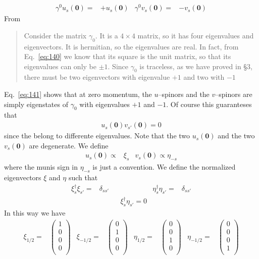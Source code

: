 \begin{frame}
\begin{align}
\label{eq:141}
\gamma^0u_s(\mathbf{0})=&+u_s(\mathbf{0})&    \gamma^0v_s(\mathbf{0})=&-v_s(\mathbf{0})
\end{align}
From \cite{physics/0703214}
\begin{quote}
  Consider the matrix $\gamma_0$. It is a $4\times4$ matrix, so it has four eigenvalues and eigenvectors. It is hermitian, so the eigenvalues are real. In fact, from Eq.~\eqref{eq:140} we know that its square is the unit matrix, so that its eigenvalues can only be $\pm1$. Since $\gamma_0$ is traceless, as we have proved in \S3, there must be two eigenvectors with eigenvalue $+1$ and two with $-1$
\end{quote}
Eq.~\eqref{eq:141} shows that at zero momentum, the $u$--spinors and the $v$--spinors are simply eigenstates of $\gamma_0$ with eigenvalues $+1$ and $-1$.  Of course this guaranteses that
\begin{align}
  u_s(\mathbf{0})v_{s'}(\mathbf{0})=0
\end{align}
since the belong to differente eigenvalues. Note that the two $u_s(\mathbf{0})$ and the two $v_s(\mathbf{0})$ are degenerate. We define
\begin{align}
  \label{eq:145}
  u_s(\mathbf{0})\propto&\xi_s & v_s(\mathbf{0})\propto\eta_{-s}
\end{align}
where the munis sign in $\eta_{-s}$ is just a convention. We define the normalized eigenvectors $\xi$ and $\eta$ such that
\begin{align}
  \xi_s^\dagger\xi_{s'}=&\delta_{s s'}&&&\eta^\dagger_s\eta_{s'}=&\delta_{s s'}\nonumber\\
&&&\xi_s^\dagger\eta_{s'}=0&&
\end{align}
In this way we have
\begin{align}
  \xi_{1/2}=&\begin{pmatrix}
    1\\
    0\\
    0\\
    0\\
  \end{pmatrix}&
  \xi_{-1/2}=&\begin{pmatrix}
    0\\
    1\\
    0\\
    0\\
  \end{pmatrix} & 
\eta_{1/2}=&\begin{pmatrix}
    0\\
    0\\
    1\\
    0\\
  \end{pmatrix}&
  \eta_{-1/2}=&\begin{pmatrix}
    0\\
    0\\
    0\\
    1\\
  \end{pmatrix}
\end{align}


\end{frame}

